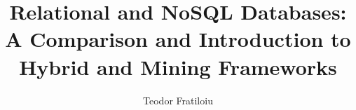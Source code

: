 \documentclass[10pt,        %
               a4paper,     %
               journal,     %
               ]{IEEEtran}
\makeatletter
\def\markboth#1#2{\def\leftmark{\@IEEEcompsoconly{\sffamily}\MakeUppercase{\protect#1}}%
\def\rightmark{\@IEEEcompsoconly{\sffamily}\MakeUppercase{\protect#2}}}
\makeatother
\begin{document}
\title{Relational and NoSQL Databases: A Comparison and Introduction to Hybrid and Mining Frameworks}


\author{Teodor Fratiloiu}%

% 
%

\markboth{Scientific Seminar on Security in Information Technology, Winter Semester 2020/2021}%
{Teodor Fratiloiu: Comparison of SQL Relational Databases and NoSQL Graph Databases}

% 
\end{document}
